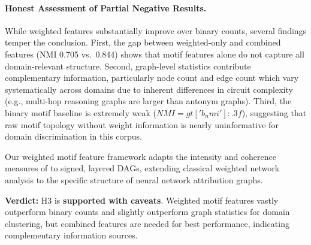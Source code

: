 \paragraph{Honest Assessment of Partial Negative Results.}
While weighted features substantially improve over binary counts, several findings temper the conclusion. First, the gap between weighted-only and combined features (NMI 0.705 vs.\ 0.844) shows that motif features alone do not capture all domain-relevant structure. Second, graph-level statistics contribute complementary information, particularly node count and edge count which vary systematically across domains due to inherent differences in circuit complexity (e.g., multi-hop reasoning graphs are larger than antonym graphs). Third, the binary motif baseline is extremely weak ($NMI={gt['b_nmi']:.3f}$), suggesting that raw motif topology without weight information is nearly uninformative for domain discrimination in this corpus.

Our weighted motif feature framework adapts the intensity and coherence measures of \citet{onnela2005intensity} to signed, layered DAGs, extending classical weighted network analysis \cite{fagiolo2007clustering} to the specific structure of neural network attribution graphs.

\textbf{Verdict:} H3 is \textbf{supported with caveats}. Weighted motif features vastly outperform binary counts and slightly outperform graph statistics for domain clustering, but combined features are needed for best performance, indicating complementary information sources.